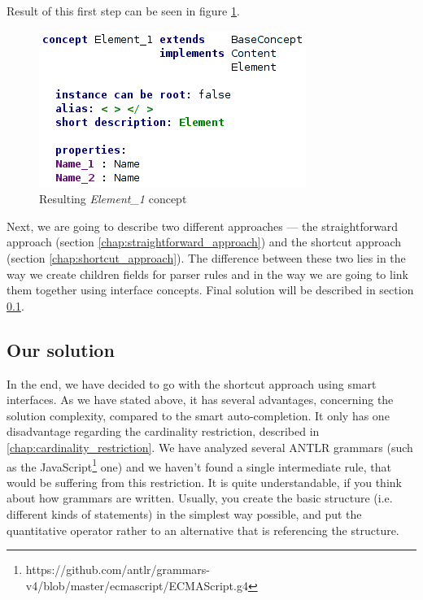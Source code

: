 Result of this first step can be seen in figure \ref{fig:element_concept_common}.

\begin{figure}[h]
	\centering
	\includegraphics[scale=0.7]{./img/element_concept_common.png}
	\caption{Resulting \textit{Element{\_}1} concept}
	\label{fig:element_concept_common}
\end{figure}

Next, we are going to describe two different approaches --- the straightforward approach (section \ref{chap:straightforward_approach}) and the shortcut approach (section \ref{chap:shortcut_approach}).
The difference between these two lies in the way we create children fields for parser rules and in the way we are going to link them together using interface concepts.
Final solution will be described in section \ref{chap:structure_solution}.

\pagebreak



\pagebreak



\pagebreak

\subsection{Our solution}
\label{chap:structure_solution}

In the end, we have decided to go with the shortcut approach using smart interfaces. 
As we have stated above, it has several advantages, concerning the solution complexity, compared to the smart auto-completion.
It only has one disadvantage regarding the cardinality restriction, described in \ref{chap:cardinality_restriction}.
We have analyzed several ANTLR grammars (such as the JavaScript\footnote{https://github.com/antlr/grammars-v4/blob/master/ecmascript/ECMAScript.g4} one) and we haven't found a single intermediate rule, that would be suffering from this restriction.
It is quite understandable, if you think about how grammars are written.
Usually, you create the basic structure (i.e. different kinds of statements) in the simplest way possible, and put the quantitative operator rather to an alternative that is referencing the structure.
\\

